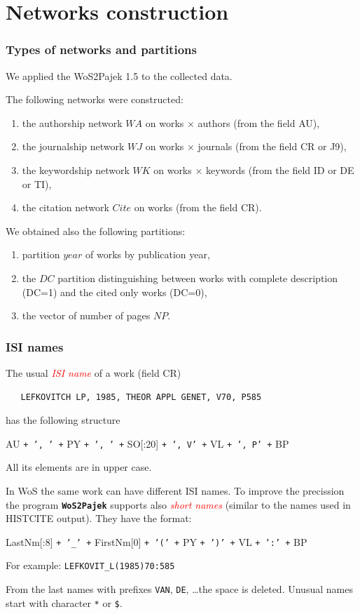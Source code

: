 \documentclass[hyperref={pdfstartview={FitBH -32768},
                         pdfpagemode=FullScreen,
                         plainpages=false,
                         colorlinks=true}
              ]{beamer}
\newcommand{\WoSPajek}{\texttt{\textbf{WoS2Pajek}}\xspace}
\newcommand{\keyw}[1]{\textcolor{red}{\emph{#1}}}
\begin{document}
\section{Networks construction}



\begin{frame}[fragile]
\frametitle{Types of networks and partitions}
\small
We applied the WoS2Pajek 1.5  to the collected data.\medskip

The following networks were constructed: 
\begin{enumerate}
\item the authorship network $WA$ on works $\times$ authors  (from the field AU), 
\item the journalship network $WJ$ on  works $\times$ journals  (from the field CR or J9), 
\item the keywordship network $WK$ on works  $\times$ keywords (from the field ID or DE or TI), 
\item the citation network $Cite$ on works (from the field CR).
\end{enumerate}

We obtained also the following partitions: 
\begin{enumerate}
\item partition $year$ of works by publication year, 
\item the $DC$ partition distinguishing between works with complete description (DC=1) and the cited only works (DC=0),
\item the vector of number of pages $NP$.
\end{enumerate}
\medskip

\end{frame}

\begin{frame}[fragile]
\frametitle{ISI names}
\footnotesize
The usual \keyw{ISI name} of a work (field CR)
\begin{verbatim}
   LEFKOVITCH LP, 1985, THEOR APPL GENET, V70, P585
\end{verbatim}
has the following structure\medskip

   AU \texttt{+ ', ' +} PY \texttt{+ ', ' +} SO[:20] \texttt{+ ', V' +} VL  \texttt{+ ', P' +} BP\medskip

\noindent All its elements are in upper case.

In WoS the same work can have different ISI names. To improve
the precission the program \WoSPajek supports also
\keyw{short names} (similar to the names used in HISTCITE output).
They have the format:\medskip

   LastNm[:8] \texttt{+ '\_' +} FirstNm[0] \texttt{+ '(' +} PY
   \texttt{+ ')' +} VL \texttt{+ ':' +} BP\medskip

For example: \quad
\texttt{LEFKOVIT\_L(1985)70:585}

From the last names with prefixes \texttt{VAN}, \texttt{DE}, \ldots the space is deleted.
Unusual names start with character \texttt{*} or \texttt{\$}.

\end{frame}
\end{document}
